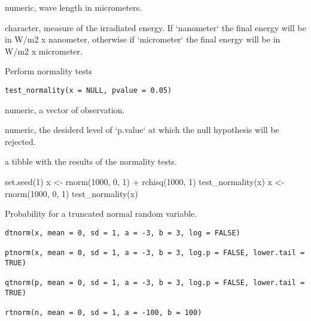 \documentclass[a4paper]{book}
\begin{document}
%
\begin{Arguments}
\begin{ldescription}
\item[\code{lambda}] numeric, wave length in micrometers.

\item[\code{measure}] character, measure of the irradiated energy. If `nanometer` the final energy will be in W/m2 x nanometer,
otherwise if `micrometer` the final energy will be in W/m2 x micrometer.
\end{ldescription}
\end{Arguments}
%
\begin{Description}\relax
Perform normality tests
\end{Description}
%
\begin{Usage}
\begin{verbatim}
test_normality(x = NULL, pvalue = 0.05)
\end{verbatim}
\end{Usage}
%
\begin{Arguments}
\begin{ldescription}
\item[\code{x}] numeric, a vector of observation.

\item[\code{pvalue}] numeric, the desiderd level of `p.value` at which the null hypothesis will be rejected.
\end{ldescription}
\end{Arguments}
%
\begin{Value}
a tibble with the results of the normality tests.
\end{Value}
%
\begin{Examples}
\begin{ExampleCode}
set.seed(1)
x <- rnorm(1000, 0, 1) + rchisq(1000, 1)
test_normality(x)
x <- rnorm(1000, 0, 1)
test_normality(x)

\end{ExampleCode}
\end{Examples}
%
\begin{Description}\relax
Probability for a truncated normal random variable.
\end{Description}
%
\begin{Usage}
\begin{verbatim}
dtnorm(x, mean = 0, sd = 1, a = -3, b = 3, log = FALSE)

ptnorm(x, mean = 0, sd = 1, a = -3, b = 3, log.p = FALSE, lower.tail = TRUE)

qtnorm(p, mean = 0, sd = 1, a = -3, b = 3, log.p = FALSE, lower.tail = TRUE)

rtnorm(n, mean = 0, sd = 1, a = -100, b = 100)
\end{verbatim}
\end{Usage}
\end{document}
